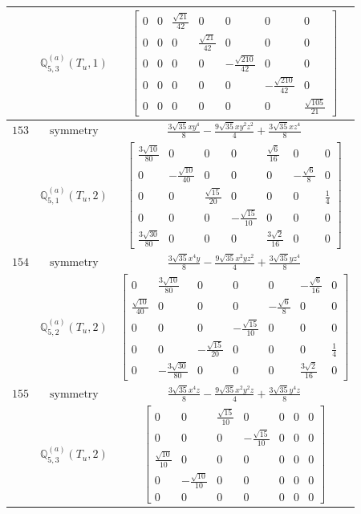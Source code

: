 \documentclass[fleqn,8pt,landscape]{jsarticle}
\begin{document}
\begin{longtable}{ccc}
$  $ & $ \mathbb{Q}_{5,3}^{(a)}(T_{u},1) $ & $ \begin{bmatrix} 0 & 0 & \frac{\sqrt{21}}{42} & 0 & 0 & 0 & 0 \\ 0 & 0 & 0 & \frac{\sqrt{21}}{42} & 0 & 0 & 0 \\ 0 & 0 & 0 & 0 & - \frac{\sqrt{210}}{42} & 0 & 0 \\ 0 & 0 & 0 & 0 & 0 & - \frac{\sqrt{210}}{42} & 0 \\ 0 & 0 & 0 & 0 & 0 & 0 & \frac{\sqrt{105}}{21} \end{bmatrix} $ \\ \hline
$ 153 $ & $ \text{symmetry} $ & $ \frac{3 \sqrt{35} x y^{4}}{8} - \frac{9 \sqrt{35} x y^{2} z^{2}}{4} + \frac{3 \sqrt{35} x z^{4}}{8} $ \\
$  $ & $ \mathbb{Q}_{5,1}^{(a)}(T_{u},2) $ & $ \begin{bmatrix} \frac{3 \sqrt{10}}{80} & 0 & 0 & 0 & \frac{\sqrt{6}}{16} & 0 & 0 \\ 0 & - \frac{\sqrt{10}}{40} & 0 & 0 & 0 & - \frac{\sqrt{6}}{8} & 0 \\ 0 & 0 & \frac{\sqrt{15}}{20} & 0 & 0 & 0 & \frac{1}{4} \\ 0 & 0 & 0 & - \frac{\sqrt{15}}{10} & 0 & 0 & 0 \\ \frac{3 \sqrt{30}}{80} & 0 & 0 & 0 & \frac{3 \sqrt{2}}{16} & 0 & 0 \end{bmatrix} $ \\ \hline
$ 154 $ & $ \text{symmetry} $ & $ \frac{3 \sqrt{35} x^{4} y}{8} - \frac{9 \sqrt{35} x^{2} y z^{2}}{4} + \frac{3 \sqrt{35} y z^{4}}{8} $ \\
$  $ & $ \mathbb{Q}_{5,2}^{(a)}(T_{u},2) $ & $ \begin{bmatrix} 0 & \frac{3 \sqrt{10}}{80} & 0 & 0 & 0 & - \frac{\sqrt{6}}{16} & 0 \\ \frac{\sqrt{10}}{40} & 0 & 0 & 0 & - \frac{\sqrt{6}}{8} & 0 & 0 \\ 0 & 0 & 0 & - \frac{\sqrt{15}}{10} & 0 & 0 & 0 \\ 0 & 0 & - \frac{\sqrt{15}}{20} & 0 & 0 & 0 & \frac{1}{4} \\ 0 & - \frac{3 \sqrt{30}}{80} & 0 & 0 & 0 & \frac{3 \sqrt{2}}{16} & 0 \end{bmatrix} $ \\ \hline
$ 155 $ & $ \text{symmetry} $ & $ \frac{3 \sqrt{35} x^{4} z}{8} - \frac{9 \sqrt{35} x^{2} y^{2} z}{4} + \frac{3 \sqrt{35} y^{4} z}{8} $ \\
$  $ & $ \mathbb{Q}_{5,3}^{(a)}(T_{u},2) $ & $ \begin{bmatrix} 0 & 0 & \frac{\sqrt{15}}{10} & 0 & 0 & 0 & 0 \\ 0 & 0 & 0 & - \frac{\sqrt{15}}{10} & 0 & 0 & 0 \\ \frac{\sqrt{10}}{10} & 0 & 0 & 0 & 0 & 0 & 0 \\ 0 & - \frac{\sqrt{10}}{10} & 0 & 0 & 0 & 0 & 0 \\ 0 & 0 & 0 & 0 & 0 & 0 & 0 \end{bmatrix} $ \\ \hline

\end{longtable}
\end{document}
